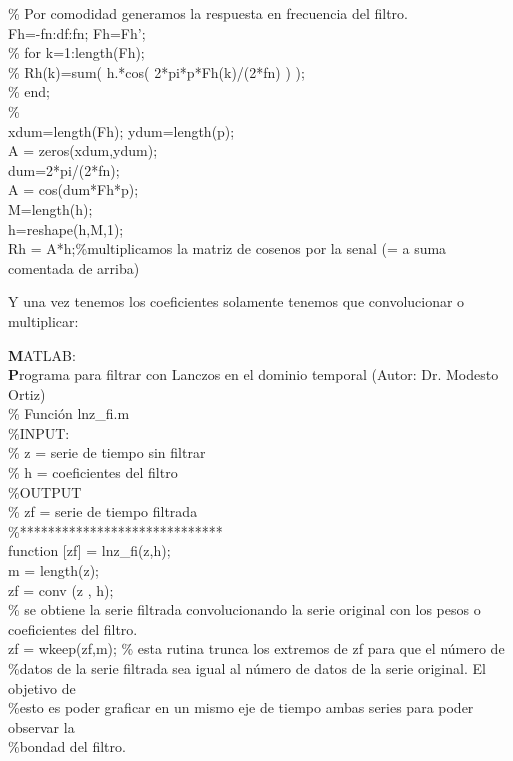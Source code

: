 \documentclass[
]{agujournal2019}
\begin{document}
\begin{framed}
\% Por comodidad generamos la respuesta en frecuencia del filtro.\\

 Fh=-fn:df:fn; Fh=Fh';\\
\% for k=1:length(Fh);\\
\% Rh(k)=sum( h.*cos( 2*pi*p*Fh(k)/(2*fn) ) );\\
\% end;\\
\% \\
xdum=length(Fh); ydum=length(p);\\
A = zeros(xdum,ydum);\\
dum=2*pi/(2*fn);\\
A = cos(dum*Fh*p);\\

M=length(h);\\
h=reshape(h,M,1);\\

Rh = A*h;\%multiplicamos la matriz de cosenos por la senal (= a suma comentada de arriba)\\

\end{framed}

Y una vez tenemos los coeficientes solamente tenemos que convolucionar o
multiplicar:

\begin{framed}
{\noindent \textbf MATLAB:}\\
{\textbf Programa para filtrar con Lanczos en el dominio temporal (Autor: Dr. Modesto Ortiz)}\\
\noindent \% Función lnz\_fi.m\\
\%INPUT:\\
\% z = serie de tiempo sin filtrar \\
\% h = coeficientes del filtro\\
\%OUTPUT\\
\% zf = serie de tiempo filtrada \\
\%*****************************\\
{\noindent}function [zf] = lnz\_fi(z,h);\\
m = length(z);\\
zf = conv (z , h); \\
\% se obtiene la serie filtrada convolucionando la serie original con los pesos o coeficientes del filtro.\\
zf = wkeep(zf,m); \% esta rutina trunca los extremos de zf para que el número de \\
\%datos de la serie filtrada sea igual al número de datos de la serie original. El objetivo de \\
\%esto es poder graficar en un mismo eje de tiempo ambas series para poder observar la \\
\%bondad del filtro.\\
\end{framed}
\end{document}
